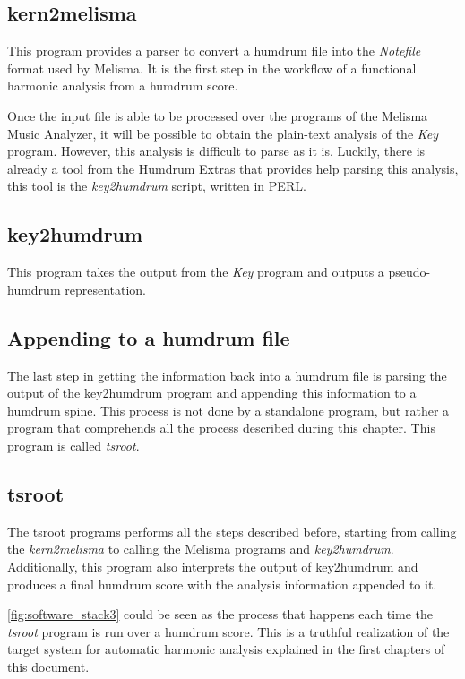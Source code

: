   \subsection{kern2melisma}
    This program provides a parser to convert a humdrum file into the \emph{Notefile} format used by Melisma. It is the first step in the workflow of a functional harmonic analysis from a humdrum score.

  Once the input file is able to be processed over the programs of the Melisma Music Analyzer, it will be possible to obtain the plain-text analysis of the \emph{Key} program. However, this analysis is difficult to parse as it is. Luckily, there is already a tool from the Humdrum Extras that provides help parsing this analysis, this tool is the \emph{key2humdrum} script, written in PERL.

  \subsection{key2humdrum}
    This program takes the output from the \emph{Key} program and outputs a pseudo-humdrum representation.

  \subsection{Appending to a humdrum file}
    The last step in getting the information back into a humdrum file is parsing the output of the key2humdrum program and appending this information to a humdrum spine. This process is not done by a standalone program, but rather a program that comprehends all the process described during this chapter. This program is called \emph{tsroot}.

  \subsection{tsroot}
    The tsroot programs performs all the steps described before, starting from calling the \emph{kern2melisma} to calling the Melisma programs and \emph{key2humdrum}. Additionally, this program also interprets the output of key2humdrum and produces a final humdrum score with the analysis information appended to it.

    \autoref{fig:software_stack3} could be seen as the process that happens each time the \emph{tsroot} program is run over a humdrum score. This is a truthful realization of the target system for automatic harmonic analysis explained in the first chapters of this document.

\newpage
